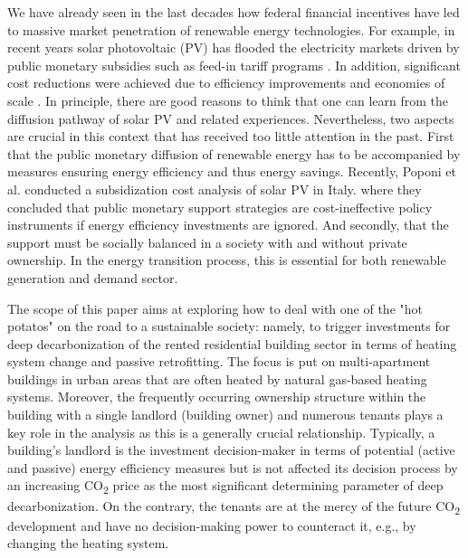 We have already seen in the last decades how federal financial incentives have led to massive market penetration of renewable energy technologies. For example, in recent years solar photovoltaic (PV) has flooded the electricity markets driven by public monetary subsidies such as feed-in tariff programs \cite{hoppmann2014compulsive}. In addition, significant cost reductions were achieved due to efficiency improvements and economies of scale \cite{haas2011historical}. In principle, there are good reasons to think that one can learn from the diffusion pathway of solar PV and related experiences. Nevertheless, two aspects are crucial in this context that has received too little attention in the past. First that the public monetary diffusion of renewable energy has to be accompanied by measures ensuring energy efficiency and thus energy savings. Recently, Poponi et al. \cite{poponi2021subsidisation} conducted a subsidization cost analysis of solar PV in Italy. where they concluded that public monetary support strategies are cost-ineffective policy instruments if energy efficiency investments are ignored. And secondly, that the support must be socially balanced in a society with and without private ownership. In the energy transition process, this is essential for both renewable generation and demand sector.\vspace{0.5cm}

The scope of this paper aims at exploring how to deal with one of the "hot potatos" on the road to a sustainable society: namely, to trigger investments for deep decarbonization of the rented residential building sector in terms of heating system change and passive retrofitting. The focus is put on multi-apartment buildings in urban areas that are often heated by natural gas-based heating systems. Moreover, the frequently occurring ownership structure within the building with a single landlord (building owner) and numerous tenants plays a key role in the analysis as this is a generally crucial relationship. Typically, a building's landlord is the investment decision-maker in terms of potential (active and passive) energy efficiency measures but is not affected its decision process by an increasing CO\textsubscript{2} price as the most significant determining parameter of deep decarbonization. On the contrary, the tenants are at the mercy of the future CO\textsubscript{2} development and have no decision-making power to counteract it, e.g., by changing the heating system.\vspace{0.5cm}

